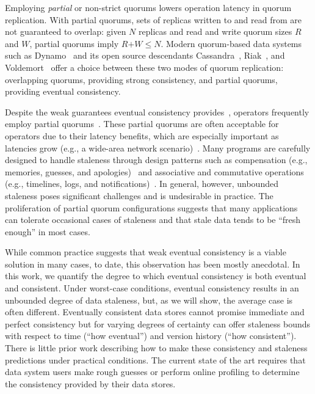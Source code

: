 \documentclass{vldb}
\begin{document}
Employing \textit{partial} or non-strict quorums lowers operation
latency in quorum replication.  With partial quorums, sets of replicas
written to and read from are not guaranteed to overlap: given $N$
replicas and read and write quorum sizes $R$ and $W$, partial quorums
imply $R$$+$$W$$\leq$$N$.  Modern quorum-based data systems such as
Dynamo~\cite{dynamo} and its open source descendants
Cassandra~\cite{cassandra}, Riak~\cite{riak}, and
Voldemort~\cite{voldemort} offer a choice between these two modes of
quorum replication: overlapping quorums, providing strong consistency,
and partial quorums, providing eventual consistency.

Despite the weak guarantees eventual consistency
provides~\cite{hamilton-cap, cops, walter}, operators frequently
employ partial quorums~\cite{cassandra, cassandra-docs,
  cassandradefault,feinbergpc,reddit, outbrain, maxperfblog}.  These
partial quorums are often acceptable for operators due to their
latency benefits, which are especially important as latencies grow
(e.g., a wide-area network scenario)~\cite{abadilatconsist,
  feinbergpc, hamilton-cap, helland}. Many programs are carefully
designed to handle staleness through design patterns such as
compensation (e.g., memories, guesses, and apologies)~\cite{helland}
and associative and commutative operations (e.g., timelines, logs, and
notifications)~\cite{calm}.  In general, however, unbounded staleness
poses significant challenges and is undesirable in practice.  The
proliferation of partial quorum configurations suggests that many
applications can tolerate occasional cases of staleness and that stale
data tends to be ``fresh enough'' in most cases.

While common practice suggests that weak eventual consistency is a
viable solution in many cases, to date, this observation has been
mostly anecdotal. In this work, we quantify the degree to which
eventual consistency is both eventual and consistent. Under worst-case
conditions, eventual consistency results in an unbounded degree of
data staleness, but, as we will show, the average case is often
different.  Eventually consistent data stores cannot promise immediate
and perfect consistency but for varying degrees of certainty can offer
staleness bounds with respect to time (``how eventual'') and version
history (``how consistent'').  There is little prior work describing
how to make these consistency and staleness predictions under
practical conditions.  The current state of the art requires that data
system users make rough guesses or perform online profiling to
determine the consistency provided by their data stores.
\end{document}
